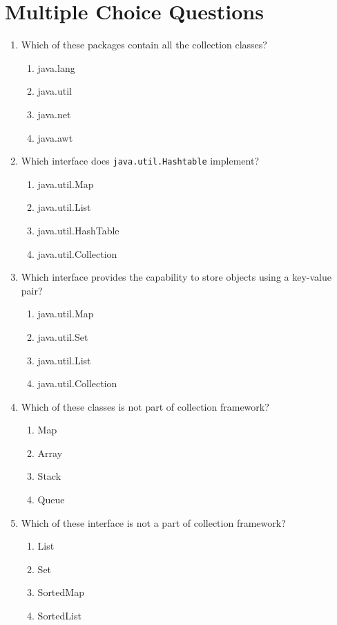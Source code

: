 \documentclass[11pt,a4paper]{article}
\begin{document}
\section*{Multiple Choice Questions}
\begin{enumerate}
    \item Which of these packages contain all the collection classes?
    \begin{enumerate}
	\item java.lang
	\item java.util
	\item java.net
	\item java.awt
    \end{enumerate}
    \item Which interface does \texttt{java.util.Hashtable} implement?
    \begin{enumerate}
	\item java.util.Map
	\item java.util.List
        \item java.util.HashTable
	\item java.util.Collection
    \end{enumerate}
    \item Which interface provides the capability to store objects using a key-value pair?
    \begin{enumerate}
	\item java.util.Map
        \item java.util.Set
        \item java.util.List	
	\item java.util.Collection
    \end{enumerate}
    \item Which of these classes is not part of collection framework?
    \begin{enumerate}
	\item Map
	\item Array
	\item Stack
	\item Queue
    \end{enumerate}
    \item Which of these interface is not a part of collection framework?
    \begin{enumerate}
	\item List
	\item Set
	\item SortedMap
	\item SortedList
    \end{enumerate}

\end{enumerate}
\end{document}
